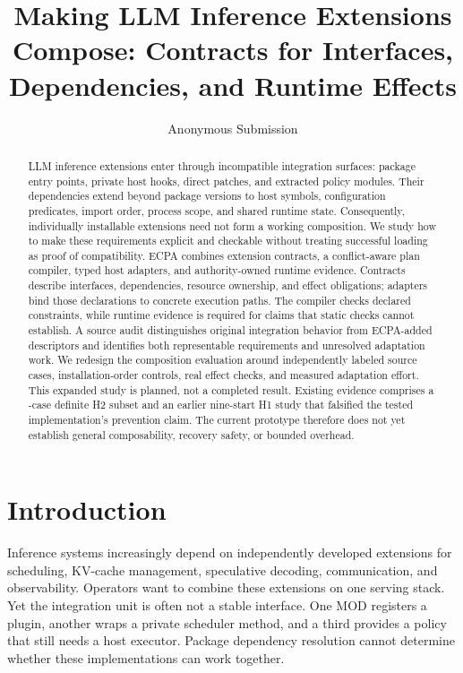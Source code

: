 \documentclass[letterpaper,twocolumn,10pt]{article}
\title{\Large \bf Making LLM Inference Extensions Compose: Contracts for Interfaces, Dependencies, and Runtime Effects}
\author{Anonymous Submission}
\date{}
\begin{document}
\pagestyle{plain}
\maketitle

\begin{abstract}
LLM inference extensions enter through incompatible integration surfaces:
package entry points, private host hooks, direct patches, and extracted policy
modules. Their dependencies extend beyond package versions to host symbols,
configuration predicates, import order, process scope, and shared runtime
state. Consequently, individually installable extensions need not form a
working composition. We study how to make these requirements explicit and
checkable without treating successful loading as proof of compatibility.
ECPA combines extension contracts, a conflict-aware plan compiler, typed host
adapters, and authority-owned runtime evidence. Contracts describe interfaces,
dependencies, resource ownership, and effect obligations; adapters bind those
declarations to concrete execution paths. The compiler checks declared
constraints, while runtime evidence is required for claims that static checks
cannot establish. A source audit distinguishes original integration behavior
from ECPA-added descriptors and identifies both representable requirements and
unresolved adaptation work. We redesign the composition evaluation around
independently labeled source cases, installation-order controls, real effect
checks, and measured adaptation effort. This expanded study is planned, not
a completed result. Existing evidence comprises a
\ECPAHTwoScoredCases{}-case definite H2 subset and an earlier nine-start H1
study that falsified the tested implementation's prevention claim.
The current prototype therefore does not yet establish general composability,
recovery safety, or bounded overhead.
\end{abstract}

\section{Introduction}
Inference systems increasingly depend on independently developed extensions
for scheduling, KV-cache management, speculative decoding, communication,
and observability. Operators want to combine these extensions on one serving
stack. Yet the integration unit is often not a stable interface. One MOD
registers a plugin, another wraps a private scheduler method, and a third
provides a policy that still needs a host executor. Package dependency
resolution cannot determine whether these implementations can work together.
\end{document}
